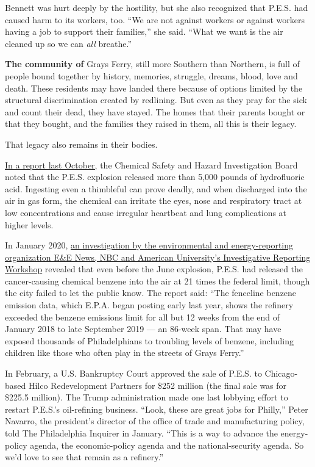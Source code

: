Bennett was hurt deeply by the hostility, but she also recognized that
P.E.S. had caused harm to its workers, too. ``We are not against workers
or against workers having a job to support their families,'' she said.
``What we want is the air cleaned up so we can \emph{all} breathe.''

\textbf{The community of} Grays Ferry, still more Southern than
Northern, is full of people bound together by history, memories,
struggle, dreams, blood, love and death. These residents may have landed
there because of options limited by the structural discrimination
created by redlining. But even as they pray for the sick and count their
dead, they have stayed. The homes that their parents bought or that they
bought, and the families they raised in them, all this is their legacy.

That legacy also remains in their bodies.

\href{https://www.phila.gov/media/20191202091559/refineryreport12219.pdf}{In
a report last October,} the Chemical Safety and Hazard Investigation
Board noted that the P.E.S. explosion released more than 5,000 pounds of
hydrofluoric acid. Ingesting even a thimbleful can prove deadly, and
when discharged into the air in gas form, the chemical can irritate the
eyes, nose and respiratory tract at low concentrations and cause
irregular heartbeat and lung complications at higher levels.

In January 2020,
\href{https://www.nbcnews.com/science/environment/massive-oil-refinery-leaks-toxic-chemical-middle-philadelphia-n1115336}{an
investigation by the environmental and energy-reporting organization
E\&E News, NBC and American University's Investigative Reporting
Workshop} revealed that even before the June explosion, P.E.S. had
released the cancer-causing chemical benzene into the air at 21 times
the federal limit, though the city failed to let the public know. The
report said: ``The fenceline benzene emission data, which E.P.A. began
posting early last year, shows the refinery exceeded the benzene
emissions limit for all but 12 weeks from the end of January 2018 to
late September 2019 --- an 86-week span. That may have exposed thousands
of Philadelphians to troubling levels of benzene, including children
like those who often play in the streets of Grays Ferry.''

In February, a U.S. Bankruptcy Court approved the sale of P.E.S. to
Chicago-based Hilco Redevelopment Partners for \$252 million (the final
sale was for \$225.5 million). The Trump administration made one last
lobbying effort to restart P.E.S.'s oil-refining business. ``Look, these
are great jobs for Philly,'' Peter Navarro, the president's director of
the office of trade and manufacturing policy, told The Philadelphia
Inquirer in January. ``This is a way to advance the energy-policy
agenda, the economic-policy agenda and the national-security agenda. So
we'd love to see that remain as a refinery.''


